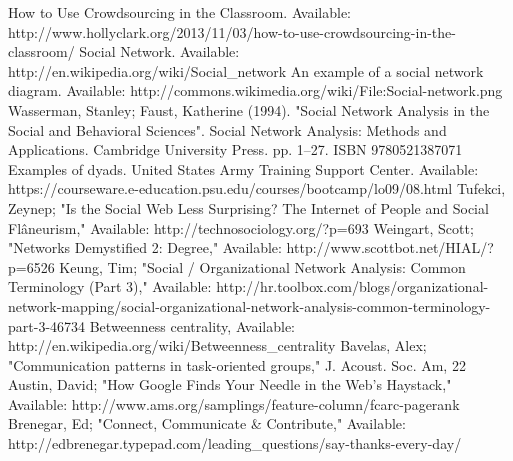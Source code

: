 \documentclass[conference,letterpaper]{IEEEtran}
\begin{document}

\begin{thebibliography}{1}
How to Use Crowdsourcing in the Classroom. Available: http://www.hollyclark.org/2013/11/03/how-to-use-crowdsourcing-in-the-classroom/
Social Network. Available: http://en.wikipedia.org/wiki/Social\_network
An example of a social network diagram. Available: http://commons.wikimedia.org/wiki/File:Social-network.png
Wasserman, Stanley; Faust, Katherine (1994). "Social Network Analysis in the Social and Behavioral Sciences". Social Network Analysis: Methods and Applications. Cambridge University Press. pp. 1–27. ISBN 9780521387071
Examples of dyads. United States Army Training Support Center. Available: https://courseware.e-education.psu.edu/courses/bootcamp/lo09/08.html
Tufekci, Zeynep; "Is the Social Web Less Surprising? The Internet of People and Social Flâneurism," Available: http://technosociology.org/?p=693
Weingart, Scott; "Networks Demystified 2: Degree," Available: http://www.scottbot.net/HIAL/?p=6526
Keung, Tim; "Social / Organizational Network Analysis: Common Terminology (Part 3)," Available: http://hr.toolbox.com/blogs/organizational-network-mapping/social-organizational-network-analysis-common-terminology-part-3-46734
Betweenness centrality, Available: http://en.wikipedia.org/wiki/Betweenness\_centrality
Bavelas, Alex; "Communication patterns in task-oriented groups," J. Acoust. Soc. Am, 22
Austin, David; "How Google Finds Your Needle in the Web's Haystack," Available: http://www.ams.org/samplings/feature-column/fcarc-pagerank
Brenegar, Ed; "Connect, Communicate \& Contribute," Available: http://edbrenegar.typepad.com/leading\_questions/say-thanks-every-day/

\end{thebibliography}
\end{document}
